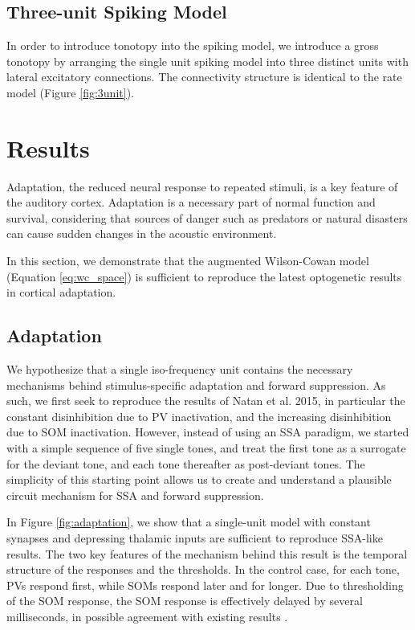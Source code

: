 \documentclass[a4paper,10pt]{article}
\begin{document}
\subsection{Three-unit Spiking Model}

In order to introduce tonotopy into the spiking model, we introduce a gross tonotopy by arranging the single unit spiking model into three distinct units with lateral excitatory connections. The connectivity structure is identical to the rate model (Figure \ref{fig:3unit}).



\section{Results}

Adaptation, the reduced neural response to repeated stimuli, is a key feature of the auditory cortex. Adaptation is a necessary part of normal function and survival, considering that sources of danger such as predators or natural disasters can cause sudden changes in the acoustic environment.

In this section, we demonstrate that the augmented Wilson-Cowan model (Equation \eqref{eq:wc_space}) is sufficient to reproduce the latest optogenetic results in cortical adaptation.

\subsection{Adaptation}\label{sec:adaptation}

We hypothesize that a single iso-frequency unit contains the necessary mechanisms behind stimulus-specific adaptation and forward suppression. As such, we first seek to reproduce the results of Natan et al. 2015, in particular the constant disinhibition due to PV inactivation, and the increasing disinhibition due to SOM inactivation. However, instead of using an SSA paradigm, we started with a simple sequence of five single tones, and treat the first tone as a surrogate for the deviant tone, and each tone thereafter as post-deviant tones. The simplicity of this starting point allows us to create and understand a plausible circuit mechanism for SSA and forward suppression.

In Figure \ref{fig:adaptation}, we show that a single-unit model with constant synapses and depressing thalamic inputs are sufficient to reproduce SSA-like results. The two key features of the mechanism behind this result is the temporal structure of the responses and the thresholds. In the control case, for each tone, PVs respond first, while SOMs respond later and for longer. Due to thresholding of the SOM response, the SOM response is effectively delayed by several milliseconds, in possible agreement with existing results \cite{natan2015complementary}.
\end{document}

